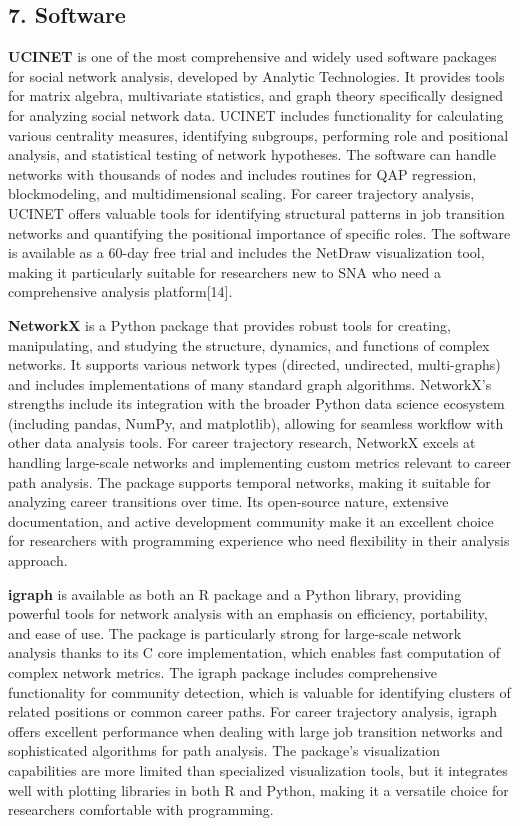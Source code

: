 \documentclass[
  letterpaper,
  DIV=11,
  numbers=noendperiod]{scrartcl}
\begin{document}
\subsection{7. Software}\label{software}

\textbf{UCINET} is one of the most comprehensive and widely used
software packages for social network analysis, developed by Analytic
Technologies. It provides tools for matrix algebra, multivariate
statistics, and graph theory specifically designed for analyzing social
network data. UCINET includes functionality for calculating various
centrality measures, identifying subgroups, performing role and
positional analysis, and statistical testing of network hypotheses. The
software can handle networks with thousands of nodes and includes
routines for QAP regression, blockmodeling, and multidimensional
scaling. For career trajectory analysis, UCINET offers valuable tools
for identifying structural patterns in job transition networks and
quantifying the positional importance of specific roles. The software is
available as a 60-day free trial and includes the NetDraw visualization
tool, making it particularly suitable for researchers new to SNA who
need a comprehensive analysis platform{[}14{]}.

\textbf{NetworkX} is a Python package that provides robust tools for
creating, manipulating, and studying the structure, dynamics, and
functions of complex networks. It supports various network types
(directed, undirected, multi-graphs) and includes implementations of
many standard graph algorithms. NetworkX's strengths include its
integration with the broader Python data science ecosystem (including
pandas, NumPy, and matplotlib), allowing for seamless workflow with
other data analysis tools. For career trajectory research, NetworkX
excels at handling large-scale networks and implementing custom metrics
relevant to career path analysis. The package supports temporal
networks, making it suitable for analyzing career transitions over time.
Its open-source nature, extensive documentation, and active development
community make it an excellent choice for researchers with programming
experience who need flexibility in their analysis approach.

\textbf{igraph} is available as both an R package and a Python library,
providing powerful tools for network analysis with an emphasis on
efficiency, portability, and ease of use. The package is particularly
strong for large-scale network analysis thanks to its C core
implementation, which enables fast computation of complex network
metrics. The igraph package includes comprehensive functionality for
community detection, which is valuable for identifying clusters of
related positions or common career paths. For career trajectory
analysis, igraph offers excellent performance when dealing with large
job transition networks and sophisticated algorithms for path analysis.
The package's visualization capabilities are more limited than
specialized visualization tools, but it integrates well with plotting
libraries in both R and Python, making it a versatile choice for
researchers comfortable with programming.
\end{document}
